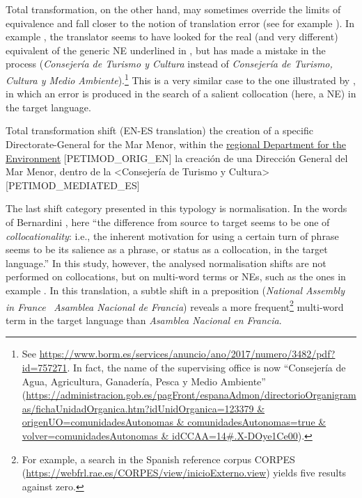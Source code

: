 \documentclass[output=paper]{langscibook}
\begin{document}
Total transformation, on the other hand, may sometimes override the limits of equivalence and fall closer to the notion of translation error (see for example \citealt{Hurtado2017}). In example , the translator seems to have looked for the real (and very different) equivalent of the generic NE underlined in , but has made a mistake in the process (\textit{Consejería de Turismo y Cultura} instead of \textit{Consejería de Turismo, Cultura y Medio Ambiente}).\footnote{See \url{https://www.borm.es/services/anuncio/ano/2017/numero/3482/pdf?id=757271}. In fact, the name of the supervising office is now “Consejería de Agua, Agricultura, Ganadería, Pesca y Medio Ambiente” (\url{https://administracion.gob.es/pagFront/espanaAdmon/directorioOrganigramas/fichaUnidadOrganica.htm?idUnidOrganica=123379 & origenUO=comunidadesAutonomas & comunidadesAutonomas=true & volver=comunidadesAutonomas & idCCAA=14\#.X-DOye1Ce00}).} This is a very similar case to the one illustrated by \citet[142]{Bernardini2016}, in which an error is produced in the search of a salient collocation (here, a NE) in the target language.


\ea\label{ex:corpas:8}
Total transformation shift (EN-ES translation)
\ea
the creation of a specific Directorate-General for the Mar Menor, within the \underline{regional Department for the Environment} [PETIMOD\_ORIG\_EN]
\ex
la creación de una Dirección General del Mar Menor, dentro de la <Consejería de Turismo y Cultura> [PETIMOD\_MEDIATED\_ES]
\z
\z

The last shift category presented in this typology is normalisation. In the words of Bernardini \citep[142]{Bernardini2016}, here “the difference from source to target seems to be one of \textit{collocationality}: i.e., the inherent motivation for using a certain turn of phrase seems to be its salience as a phrase, or status as a collocation, in the target language.” In this study, however, the analysed normalisation shifts are not performed on collocations, but on multi-word terms or NEs, such as the ones in example . In this translation, a subtle shift in a preposition (\textit{National Assembly in France} \rightarrow$\,$ \textit{Asamblea Nacional de Francia}) reveals a more frequent\footnote{For example, a search in the Spanish reference corpus CORPES (\url{https://webfrl.rae.es/CORPES/view/inicioExterno.view})  yields five results against zero.} multi-word term in the target language than \textit{Asamblea Nacional en Francia}.
\end{document}
